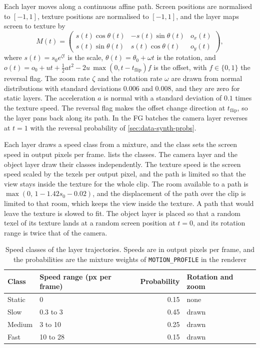Each layer moves along a continuous affine path. Screen positions are normalised to $[-1,1]$, texture positions are normalised to $[-1,1]$, and the layer maps screen to texture by
\begin{equation}
M(t)=\begin{pmatrix} s(t)\cos\theta(t) & -s(t)\sin\theta(t) & o_x(t)\\ s(t)\sin\theta(t) & s(t)\cos\theta(t) & o_y(t)\end{pmatrix},\label{eq:data-layer}
\end{equation}
where $s(t)=s_0e^{\zeta t}$ is the scale, $\theta(t)=\theta_0+\omega t$ is the rotation, and $o(t)=o_0+ut+\tfrac12 at^2-2u\,\max(0,t-t_{\mathrm{flip}})f$ is the offset, with $f\in\{0,1\}$ the reversal flag. The zoom rate $\zeta$ and the rotation rate $\omega$ are drawn from normal distributions with standard deviations 0.006 and 0.008, and they are zero for static layers. The acceleration $a$ is normal with a standard deviation of $0.1$ times the texture speed. The reversal flag makes the offset change direction at $t_{\mathrm{flip}}$, so the layer pans back along its path. In the FG batches the camera layer reverses at $t=1$ with the reversal probability of \cref{sec:data-synth-probs}.

Each layer draws a speed class from a mixture, and the class sets the screen speed in output pixels per frame.  lists the classes. The camera layer and the object layer draw their classes independently. The texture speed is the screen speed scaled by the texels per output pixel, and the path is limited so that the view stays inside the texture for the whole clip. The room available to a path is $\max(0,\,1-1.42s_0-0.02)$, and the displacement of the path over the clip is limited to that room, which keeps the view inside the texture. A path that would leave the texture is slowed to fit. The object layer is placed so that a random texel of its texture lands at a random screen position at $t=0$, and its rotation range is twice that of the camera.

\begin{table}[!htbp]
\caption{Speed classes of the layer trajectories. Speeds are in output pixels per frame, and the probabilities are the mixture weights of \texttt{MOTION\_PROFILE} in the renderer}\label{tab:data-speed}
\footnotesize
\begin{tabular}{@{}llrl@{}}
\toprule
Class & Speed range (px per frame) & Probability & Rotation and zoom \\
\midrule
Static & 0 & 0.15 & none \\
Slow & 0.3 to 3 & 0.45 & drawn \\
Medium & 3 to 10 & 0.25 & drawn \\
Fast & 10 to 28 & 0.15 & drawn \\
\bottomrule
\end{tabular}
\end{table}

